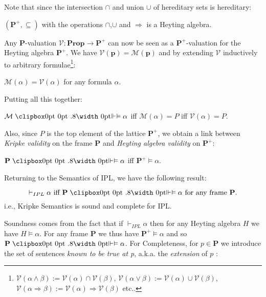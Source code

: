 	Note that since the intersection $\cap$ and union $\cup$ of hereditary sets is hereditary:
	
	\begin{thm}
		$(\textbf{P}^+, \subseteq )$ with the operations $\cap$,$\cup$ and $\Rightarrow$ is a Heyting algebra.
	\end{thm}
	
	Any \textbf{P}-valuation $\mathcal{V}: \textbf{Prop} \rightarrow \textbf{P}^+$ can now be seen as a $\textbf{P}^+$-valuation for the Heyting algebra  $\textbf{P}^+$. \newline
	We have $\mathcal{V}(\textbf{p}) = \mathcal{M}(\textbf{p})$ and by extending  $\mathcal{V}$ inductively to arbitrary formulae\footnote{$\mathcal{V}(\alpha \land \beta) := \mathcal{V}(\alpha) \cap \mathcal{V}(\beta)$, $\mathcal{V}(\alpha \lor \beta) := \mathcal{V}(\alpha) \cup \mathcal{V}(\beta)$, $\mathcal{V}(\alpha \Rightarrow \beta) := \mathcal{V}(\alpha) \Rightarrow \mathcal{V}(\beta)$ etc..}:
	\begin{lem}
		$\mathcal{M}(\alpha) = \mathcal{V}(\alpha)$ for any formula $\alpha$.
	\end{lem}
	Putting all this together:
	
	\begin{prop}
		$\mathcal{M} \VDashA \alpha$ iff $\mathcal{M}(\alpha)=P$ iff $\mathcal{V}(\alpha)=P$.
	\end{prop}
	
	Also, since $P$ is the top element of the lattice $\textbf{P}^+$, we obtain a link between \emph{Kripke validity} on the frame \textbf{P} and \emph{Heyting algebra validity} on $\textbf{P}^+$:
	
	\begin{thm}
		$\textbf{P} \VDashA \alpha$ iff $\textbf{P}^+ \models \alpha$.
	\end{thm}
	
Returning to the Semantics of IPL, we have the following result:
	
	\begin{thm}
		 \begin{equation*}
			\vdash_{IPL} \alpha\text{ iff }\textbf{P} \VDashA \alpha \text{ for any frame }\textbf{P}.
		\end{equation*} i.e.,
		Kripke Semantics is sound and complete for IPL.
\end{thm}

	Soundness comes from the fact that if $\vdash_{IPL} \alpha$ then for any Heyting algebra $H$ we have $H \models \alpha$. 
	For any frame \textbf{P} we thus have $\textbf{P}^+ \models \alpha$ and so $\textbf{P} \VDashA \alpha$. \newline
	For Completeness, for $p\in \textbf{P}$ we introduce the set of sentences \emph{known to be true at p}, a.k.a. the \emph{extension} of $p$ :
	

